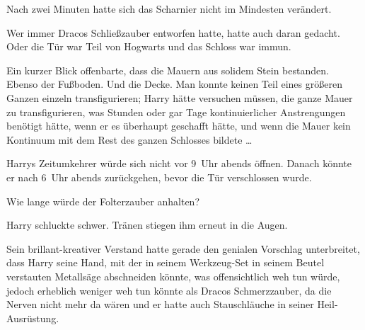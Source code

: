 Nach zwei Minuten hatte sich das Scharnier nicht im Mindesten verändert.

Wer immer Dracos Schließzauber entworfen hatte, hatte auch daran gedacht. Oder die Tür war Teil von Hogwarts und das Schloss war immun.

Ein kurzer Blick offenbarte, dass die Mauern aus solidem Stein bestanden. Ebenso der Fußboden. Und die Decke. Man konnte keinen Teil eines größeren Ganzen einzeln transfigurieren; Harry hätte versuchen müssen, die ganze Mauer zu transfigurieren, was Stunden oder gar Tage kontinuierlicher Anstrengungen benötigt hätte, wenn er es überhaupt geschafft hätte, und wenn die Mauer kein Kontinuum mit dem Rest des ganzen Schlosses bildete …

Harrys Zeitumkehrer würde sich nicht vor 9~Uhr abends öffnen. Danach könnte er nach 6~Uhr abends zurückgehen, bevor die Tür verschlossen wurde.

Wie lange würde der Folterzauber anhalten?

Harry schluckte schwer. Tränen stiegen ihm erneut in die Augen.

Sein brillant-kreativer Verstand hatte gerade den genialen Vorschlag unterbreitet, dass Harry seine Hand, mit der in seinem Werkzeug-Set in seinem Beutel verstauten Metallsäge abschneiden könnte, was offensichtlich weh tun würde, jedoch erheblich weniger weh tun könnte als Dracos Schmerzzauber, da die Nerven nicht mehr da wären und er hatte auch Stauschläuche in seiner Heil-Ausrüstung.

